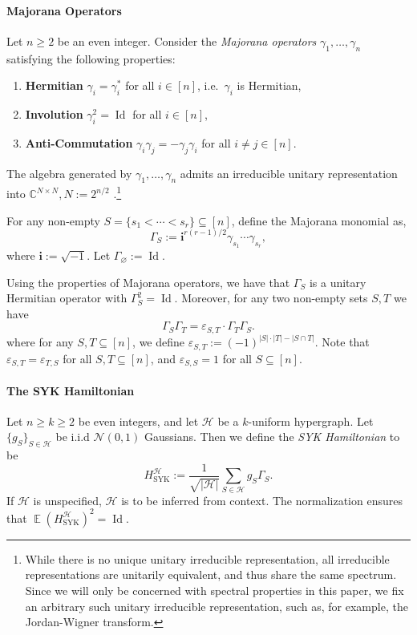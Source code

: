 \documentclass
[11pt,letterpaper]
{article}
\theoremstyle{definition}
\newcommand{\cN}{\mathcal{N}}
\newcommand{\eps}{\varepsilon}
\newcommand{\1}{\mathbf{1}}
\newcommand{\C}{\mathbb C}
\newcommand{\cH}{\mathcal H}
\newcommand{\Id}{\operatorname{Id}}
\newcommand{\seq}{\subseteq}
\DeclareMathOperator*{\E}{\mathbb{E}}
\renewcommand{\emptyset}{\varnothing}
\renewcommand{\geq}{\geqslant}
\renewcommand{\iota}{\mathbf{i}}
\begin{document}
\paragraph{Majorana Operators} Let $n\geq 2$ be an even integer. Consider the \emph{Majorana operators} $\gamma_1, \ldots, \gamma_n$ satisfying the following properties:
\begin{enumerate}[(1)]
    \item \textbf{Hermitian} $\gamma_i = \gamma_i^*$ for all $i\in[n]$, i.e.\ $\gamma_i$ is Hermitian, 
    \item \textbf{Involution} $\gamma_i^2 = \Id$ for all $i\in[n]$, 
    \item \textbf{Anti-Commutation} $\gamma_i\gamma_j = -\gamma_j\gamma_i$ for all $i\neq j\in[n]$. 
\end{enumerate}
The algebra generated by $\gamma_1, \ldots, \gamma_n$ admits an irreducible unitary representation into $\C^{N\times N}, N:= 2^{n/2}$ \cite{BravyiK02}.\footnote{While there is no unique unitary irreducible representation, all irreducible representations are unitarily equivalent, and thus share the same spectrum. Since we will only be concerned with spectral properties in this paper, we fix an arbitrary such unitary irreducible representation, such as, for example, the Jordan-Wigner transform.}

For any non-empty $S = \{s_1 < \cdots < s_r\}\seq[n]$, define the Majorana monomial as,
\[\Gamma_S:= \iota^{r(r - 1)/2}\gamma_{s_1}\cdots\gamma_{s_r},\]
where $\iota:= \sqrt{-1}$. Let $\Gamma_\emptyset := \Id$.

Using the properties of Majorana operators, we have that $\Gamma_S$ is a unitary Hermitian operator with $\Gamma_S^2 = \Id$. Moreover, for any two non-empty sets $S, T$ we have
\begin{equation}\label{eq:comm-rel}
    \Gamma_S\Gamma_T = \eps_{S, T}\cdot\Gamma_T\Gamma_S.
\end{equation}
where for any $S, T\seq[n]$, we define $\eps_{S, T}:= (-1)^{|S|\cdot|T| - |S\cap T|}$. Note that $\eps_{S, T} = \eps_{T, S}$ for all $S, T\seq[n]$, and $\eps_{S, S} = 1$ for all $S\seq[n]$. 

\paragraph{The SYK Hamiltonian} Let $n\geq k\geq 2$ be even integers, and let $\cH$ be a $k$-uniform hypergraph. Let $\{g_S\}_{S\in\cH}$ be i.i.d $\cN(0, 1)$ Gaussians. Then we define the \emph{SYK Hamiltonian} to be 
\begin{equation}\label{eq:syk-def}
    H^\cH_{\operatorname{SYK}}:= \frac{1}{\sqrt{|\cH|}}\sum_{S\in\cH}g_S\Gamma_S.
\end{equation}
If $\cH$ is unspecified, $\cH$ is to be inferred from context. The normalization ensures that $\E (H^\cH_{\operatorname{SYK}})^2 =\Id$. 
\end{document}
